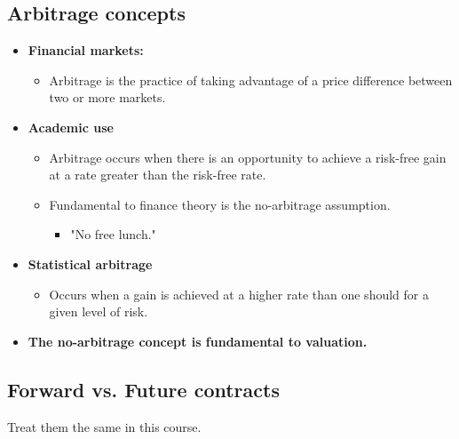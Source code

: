 \subsection{Arbitrage concepts}
\begin{terminology}
    \begin{itemize}
        \item \textbf{Financial markets:}
        \begin{itemize}
            \item Arbitrage is the practice of taking advantage of a price difference between two or more markets.
        \end{itemize}
    
        \item \textbf{Academic use}
        \begin{itemize}
            \item Arbitrage occurs when there is an opportunity to achieve a risk-free gain at a rate greater than the risk-free rate.
            \item Fundamental to finance theory is the no-arbitrage assumption.
            \begin{itemize}
                \item "No free lunch."
            \end{itemize}
        \end{itemize}
    
        \item \textbf{Statistical arbitrage}
        \begin{itemize}
            \item Occurs when a gain is achieved at a higher rate than one should for a given level of risk.
        \end{itemize}
    
        \item \textbf{The no-arbitrage concept is fundamental to valuation.}
    \end{itemize}
\end{terminology}

\subsection{Forward vs. Future contracts}
\begin{warning}
    Treat them the same in this course.
\end{warning}

